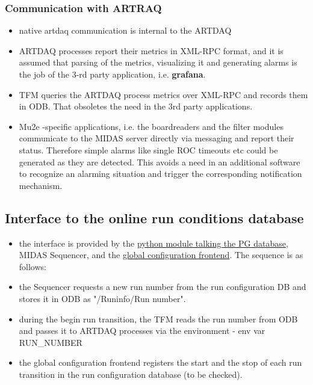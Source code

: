 \subsubsection{Communication with ARTRAQ}

\begin{itemize}
\item
  native artdaq communication is internal to the ARTDAQ
\item
  ARTDAQ processes report their metrics in XML-RPC format,
  and it is assumed that parsing of the metrics, visualizing
  it and generating alarms is the job of the 3-rd party application,
  i.e. {\bf grafana}.
\item
  TFM queries the ARTDAQ process metrics over XML-RPC and records
  them in ODB. That obsoletes the need in the 3rd party applications.
\item
  Mu2e -specific applications, i.e. the boardreaders and the filter modules 
  communicate to the MIDAS server directly via messaging and report 
  their status. Therefore simple alarms like single ROC timeouts etc
  could be generated as they are detected. 
  This avoids a need in an additional software to recognize an alarming
  situation and trigger the corresponding notification mechanism.
\end{itemize}


\subsection{Interface to the online run conditions database} 

\begin{itemize}
\item
  the interface is provided by the
  \href{https://github.com/pavel1murat/frontends/blob/main/utils/runinfodb.py}
  {\blue python module talking the PG database}, MIDAS Sequencer, and the
  \href{https://github.com/pavel1murat/frontends/blob/main/conf/mu2e_config_fe.py}
  {\blue global configuration frontend}. The sequence is as follows:
\item
  the Sequencer requests  a new run number from the run configuration DB
  and stores it in ODB as  {\blue"/Runinfo/Run number"}.
\item
  during the begin run transition, the TFM reads the run number from ODB
  and passes it to ARTDAQ processes via the environment - env var {\blue RUN\_NUMBER}
\item
  the global configuration frontend registers the start and the stop of each
  run transition in the run configuration database (to be checked).
\end{itemize}


